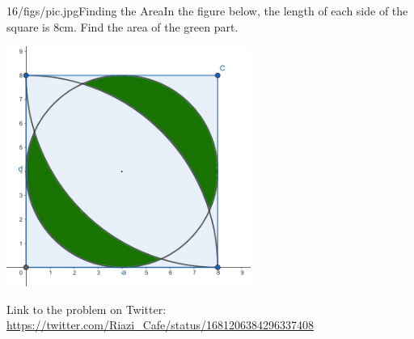 \begin{problem}{16/figs/pic.jpg}{Finding the Area}In the figure below, the length of each side of the square is 8cm. Find the area of the green part.

\begin{center}
	\includegraphics[width=8cm]{16/figs/16_geometry1.jpg}
\end{center}

Link to the problem on Twitter: \url{https://twitter.com/Riazi_Cafe/status/1681206384296337408}
\end{problem}